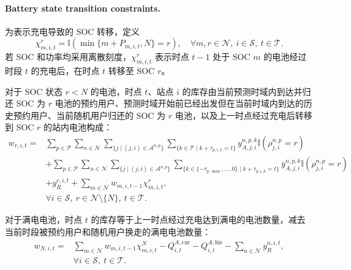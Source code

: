 \documentclass[12pt,hyperref,a4paper,UTF8]{ctexart}
\begin{document}
\paragraph{Battery state transition constraints.}
为表示充电导致的 SOC 转移，定义
\begin{equation}
\chi_{m,i,t}^{r}=\mathbb{I}\!\left(\min\{m+P_{m,i,t},N\}=r\right),
\quad \forall m,r\in\mathcal{N},\ i\in\mathcal{S},\ t\in\mathcal{T}.
\label{eq:charging_indicator}
\end{equation}
若 SOC 和功率均采用离散刻度，$\chi_{m,i,t}^{r}$ 表示时点 $t-1$ 处于 SOC $m$ 的电池经过时段 $t$ 的充电后，在时点 $t$ 转移至 SOC $r$。

对于 SOC 状态 $r<N$ 的电池，时点 $t$、站点 $i$ 的库存由当前预测时域内到达并归还 SOC 为 $r$ 电池的预约用户、预测时域开始前已经出发但在当前时域内到达的历史预约用户、当前随机用户归还的 SOC 为 $r$ 电池，以及上一时点经过充电后转移到 SOC $r$ 的站内电池构成：
\begin{equation}
\begin{aligned}
w_{r,i,t}
=&
\sum_{p\in \mathcal{P}}
\sum_{n\in \mathcal{N}}
\sum_{\{j\mid (j,i)\in \mathcal{A}^{n,p}\}}
\sum_{\{k\in \mathcal{T}\mid k+\tau_{p,i,k}=t\}}
y_{A,j,i}^{n,p,k}
\mathbb{I}\!\left(\rho_{j,i}^{n,p}=r\right)
\\
&+
\sum_{p\in \mathcal{P}}
\sum_{n\in \mathcal{N}}
\sum_{\{j\mid (j,i)\in \mathcal{A}^{n,p}\}}
\sum_{\{k\in\{-\tau_{p,\max},\ldots,0\}\mid k+\tau_{p,i,k}=t\}}
\bar{y}_{A,j,i}^{n,p,k}
\mathbb{I}\!\left(\rho_{j,i}^{n,p}=r\right)
\\
&+
y_R^{r,i,t}
+
\sum_{m\in \mathcal{N}}
w_{m,i,t-1}\chi_{m,i,t}^{r},
\\
&\forall i\in \mathcal{S},\ r\in \mathcal{N}\setminus\{N\},\ t\in \mathcal{T}.
\end{aligned}
\label{eq:transition_nonfull}
\end{equation}

对于满电电池，时点 $t$ 的库存等于上一时点经过充电达到满电的电池数量，减去当前时段被预约用户和随机用户换走的满电电池数量：
\begin{equation}
\begin{aligned}
w_{N,i,t}
=&
\sum_{m\in \mathcal{N}}
w_{m,i,t-1}\chi_{m,i,t}^{N}
-
Q_{i,t}^{A,\mathrm{cur}}
-
Q_{i,t}^{A,\mathrm{his}}
-
\sum_{n\in \mathcal{N}}y_R^{n,i,t},
\\
&\forall i\in \mathcal{S},\ t\in \mathcal{T}.
\end{aligned}
\label{eq:transition_full}
\end{equation}
\end{document}
